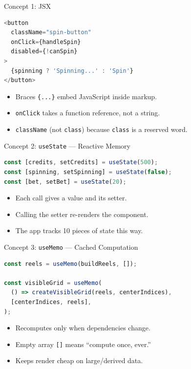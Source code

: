 \documentclass{beamer}
\begin{document}
\begin{frame}[fragile]{Concept 1: JSX}
\begin{lstlisting}[language=JavaScript]
<button
  className="spin-button"
  onClick={handleSpin}
  disabled={!canSpin}
>
  {spinning ? 'Spinning...' : 'Spin'}
</button>
\end{lstlisting}
  \begin{itemize}
    \item Braces \texttt{\{...\}} embed JavaScript inside markup.
    \item \texttt{onClick} takes a function reference, not a string.
    \item \texttt{className} (not \texttt{class}) because \texttt{class} is a reserved word.
  \end{itemize}
\end{frame}

\begin{frame}[fragile]{Concept 2: \texttt{useState} --- Reactive Memory}
\begin{lstlisting}[language=JavaScript]
const [credits, setCredits] = useState(500);
const [spinning, setSpinning] = useState(false);
const [bet, setBet] = useState(20);
\end{lstlisting}
  \begin{itemize}
    \item Each call gives a value and its setter.
    \item Calling the setter re-renders the component.
    \item The app tracks 10 pieces of state this way.
  \end{itemize}
\end{frame}

\begin{frame}[fragile]{Concept 3: \texttt{useMemo} --- Cached Computation}
\begin{lstlisting}[language=JavaScript]
const reels = useMemo(buildReels, []);

const visibleGrid = useMemo(
  () => createVisibleGrid(reels, centerIndices),
  [centerIndices, reels],
);
\end{lstlisting}
  \begin{itemize}
    \item Recomputes only when dependencies change.
    \item Empty array \texttt{[]} means ``compute once, ever.''
    \item Keeps render cheap on large/derived data.
  \end{itemize}
\end{frame}
\end{document}
